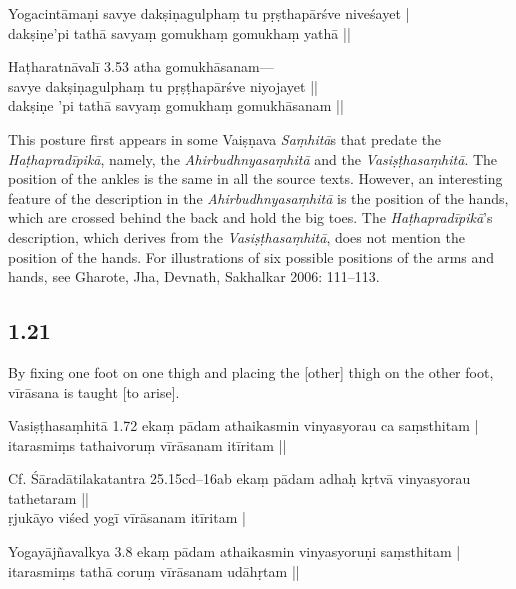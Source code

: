 \begin{ekdosis}
\begin{testimonia}[hp01_020]
Yogacintāmaṇi
\startverse
savye dakṣiṇagulphaṃ tu pṛṣthapārśve niveśayet |\\
dakṣiṇe'pi tathā savyaṃ gomukhaṃ gomukhaṃ yathā ||
\endverse

Haṭharatnāvalī 3.53
\startverse
atha gomukhāsanam---\\
savye dakṣiṇagulphaṃ tu pṛṣṭhapārśve niyojayet ||\\
dakṣiṇe 'pi tathā savyaṃ gomukhaṃ gomukhāsanam ||
\endverse
\end{testimonia}

\begin{philcomm}[hp01_020]        
This posture first appears in some Vaiṣṇava \emph{Saṃhitā}s that predate the \emph{Haṭhapradīpikā}, namely, the \emph{Ahirbudhnyasaṃhitā} and the \emph{Vasiṣṭhasaṃhitā}. The position of the ankles is the same in all the source texts. However, an interesting feature of the description in the \emph{Ahirbudhnyasaṃhitā} is the position of the hands, which are crossed behind the back and hold the big toes. The \emph{Haṭhapradīpikā}’s description, which derives from the \emph{Vasiṣṭhasaṃhitā}, does not mention the position of the hands. For illustrations of six possible positions of the arms and hands, see Gharote, Jha, Devnath, Sakhalkar 2006: 111–113.
\end{philcomm}

\subsection*{1.21}
\begin{translation}[hp01_021]
By fixing one foot on one thigh and placing the [other] thigh on the other foot, vīrāsana is taught [to arise].
\end{translation}

\begin{sources}[hp01_021]
Vasiṣṭhasaṃhitā 1.72
\startverse
ekaṃ pādam athaikasmin vinyasyorau ca saṃsthitam |\\
itarasmiṃs tathaivoruṃ vīrāsanam itīritam ||
\endverse

Cf. Śāradātilakatantra 25.15cd–16ab
\startverse
ekaṃ pādam adhaḥ kṛtvā vinyasyorau tathetaram ||\\
ṛjukāyo viśed yogī vīrāsanam itīritam |
\endverse

Yogayājñavalkya 3.8
\startverse
ekaṃ pādam athaikasmin vinyasyoruṇi saṃsthitam |\\
itarasmiṃs tathā coruṃ vīrāsanam udāhṛtam ||
\endverse
\end{sources}


\end{ekdosis}
